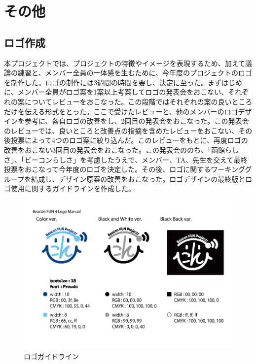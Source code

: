 \section{その他}
\subsection{ロゴ作成}
本プロジェクトでは、プロジェクトの特徴やイメージを表現するため、加えて議論の練習と、メンバー全員の一体感を生むために、今年度のプロジェクトのロゴを制作した。ロゴの制作には3週間の時間を要し、決定に至った。まずはじめに、メンバー全員がロゴ案を1案以上考案してロゴの発表会をおこない、それぞれの案についてレビューをおこなった。この段階ではそれぞれの案の良いところだけを伝える形式をとった。ここで受けたレビューと、他のメンバーのロゴデザインを参考に、各自ロゴの改善をし、2回目の発表会をおこなった。この発表会のレビューでは、良いところと改善点の指摘を含めたレビューをおこない、その後投票によって4つのロゴ案に絞り込んだ。このレビューをもとに、再度ロゴの改善をおこない3回目の発表会をおこなった。この発表会ののち、「函館らしさ」、「ビーコンらしさ」を考慮したうえで、メンバー、TA、先生を交えて最終投票をおこなって今年度のロゴを決定した。その後、ロゴに関するワーキンググループを結成し、デザイン原案の改善をおこなった。ロゴデザインの最終版とロゴ使用に関するガイドラインを作成した。

\begin{figure}[htbp]
    \begin{center}
    \includegraphics[width=14cm]{images/BeaconFUN4Logo_Manual.png}
    \end{center}
    \caption{ロゴガイドライン}
    \label{fig:LogoManual}
\end{figure}

